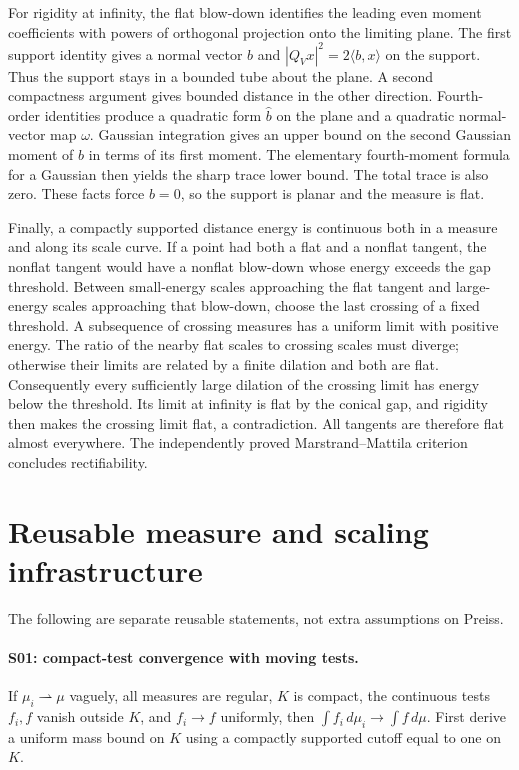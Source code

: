 For rigidity at infinity, the flat blow-down identifies the leading even
moment coefficients with powers of orthogonal projection onto the limiting
plane. The first support identity gives a normal vector $b$ and
$|Q_Vx|^2=2\langle b,x\rangle$ on the support. Thus the support stays in a bounded
tube about the plane. A second compactness argument gives bounded distance in
the other direction. Fourth-order identities produce a quadratic form
$\widehat b$ on the plane and a quadratic normal-vector map $\omega$.
Gaussian integration gives an upper bound on the second Gaussian moment of
$\widehat b$ in terms of its first moment. The elementary fourth-moment formula
for a Gaussian then yields the sharp trace lower bound. The total trace is also
zero. These facts force $b=0$, so the support is planar and the measure is flat.

Finally, a compactly supported distance energy is continuous both in a measure
and along its scale curve. If a point had both a flat and a nonflat tangent,
the nonflat tangent would have a nonflat blow-down whose energy exceeds the gap
threshold. Between small-energy scales approaching the flat tangent and
large-energy scales approaching that blow-down, choose the last crossing of a
fixed threshold. A subsequence of crossing measures has a uniform limit with
positive energy. The ratio of the nearby flat scales to crossing scales must
diverge; otherwise their limits are related by a finite dilation and both are
flat. Consequently every sufficiently large dilation of the crossing limit
has energy below the threshold. Its limit at infinity is flat by the conical
gap, and rigidity then makes the crossing limit flat, a contradiction.
All tangents are therefore flat almost everywhere. The independently proved
Marstrand--Mattila criterion concludes rectifiability.

\section{Reusable measure and scaling infrastructure}
The following are separate reusable statements, not extra assumptions on Preiss.

\paragraph{S01: compact-test convergence with moving tests.}
If $\mu_i\rightharpoonup\mu$ vaguely, all measures are regular, $K$ is compact,
the continuous tests $f_i,f$ vanish outside $K$, and $f_i\to f$ uniformly,
then $\int f_i\,d\mu_i\to\int f\,d\mu$. First derive a uniform mass bound on
$K$ using a compactly supported cutoff equal to one on $K$.

